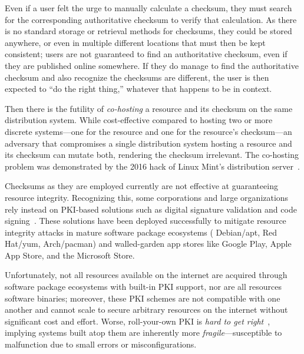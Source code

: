 Even if a user felt the urge to manually calculate a checksum, they must search
for the corresponding authoritative checksum to verify that calculation. As
there is no standard storage or retrieval methods for checksums, they could be
stored anywhere, or even in multiple different locations that must then be kept
consistent; users are not guaranteed to find an authoritative checksum, even if
they are published online somewhere. If they do manage to find the authoritative
checksum and also recognize the checksums are different, the user is then
expected to ``do the right thing,'' whatever that happens to be in context.

Then there is the futility of \emph{co-hosting} a resource and its checksum on the same
distribution system. While cost-effective compared to hosting two or more
discrete systems---one for the resource and one for the resource's
checksum---an adversary that compromises a single distribution system hosting
a resource and its checksum can mutate both, rendering the checksum
irrelevant. The co-hosting problem was demonstrated by the 2016 hack of Linux Mint's distribution
server~\cite{SCA-MINT1, SCA-MINT2}.

Checksums as they are employed currently are not effective at guaranteeing
resource integrity. Recognizing this, some corporations and large organizations
rely instead on PKI-based solutions such as digital signature validation and
code signing~\cite{PKI}. These solutions have been deployed successfully to
mitigate resource integrity attacks in mature software package ecosystems (\eg
Debian/apt, Red Hat/yum, Arch/pacman) and walled-garden app stores like Google
Play, Apple App Store, and the Microsoft Store.


Unfortunately, not all resources available on the internet are acquired through
software package ecosystems with built-in PKI support, nor are all resources
software binaries; moreover, these PKI schemes are not compatible with one
another and cannot scale to secure arbitrary resources on the internet without
significant cost and effort. Worse, roll-your-own PKI is \emph{hard to get
right}~\cite{PKI}, implying systems built atop them are inherently more
\emph{fragile}---susceptible to malfunction due to small errors or
misconfigurations.

